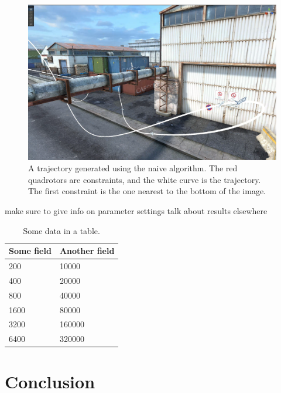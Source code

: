 \documentclass[pageno]{jpaper}
\begin{document}
\begin{figure}[hbt]
  \includegraphics[width=\linewidth]{data/rotation.png}
  \caption{A trajectory generated using the naive algorithm. The red quadrotors are constraints, and the white curve is the trajectory. The first constraint is the one nearest to the bottom of the image.}
  \label{fig:rotation}
\end{figure}


make sure to give info on parameter settings
talk about results elsewhere
\begin{table}[hbt]
  \centering
  \begin{tabular}{|l|l|} \hline
    \textbf{Some field} & \textbf{Another field}\\\hline
    200          &  10000 \\ \hline 
    400          &  20000 \\ \hline 
    800          &  40000 \\ \hline 
    1600        &  80000 \\ \hline 
    3200        &  160000 \\ \hline 
    6400        &  320000 \\ \hline 
  \end{tabular}
  \caption{Some data in a table. }
  \label{table:data}
\end{table}

\section{Conclusion}
\end{document}
